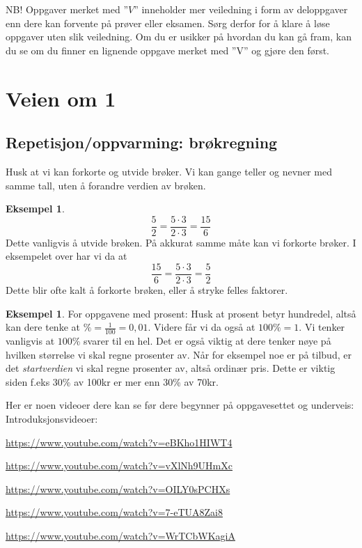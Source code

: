 \documentclass[a4, 11pt, twoside]{article}
\theoremstyle{definition}
\newtheorem{eksempel}[theorem]{Eksempel}
\begin{document}
NB! Oppgaver merket med ''$V$'' inneholder mer veiledning i form
av deloppgaver
enn dere kan forvente på prøver eller eksamen.
Sørg derfor for å klare å løse oppgaver uten slik veiledning. Om du
er usikker på hvordan du kan gå fram, kan du se om du finner en lignende
oppgave merket med ''V'' og gjøre den først.




\section*{Veien om 1}
\subsection*{Repetisjon/oppvarming: brøkregning}
Husk at vi kan forkorte og utvide brøker. Vi kan
gange teller og nevner med samme tall, uten å forandre verdien av brøken.
\begin{eksempel}
\[ \frac{5}{2} = \frac{5\cdot3}{2\cdot3} = \frac{15}{6}\]
Dette vanligvis å utvide brøken.
På akkurat samme måte kan vi forkorte brøker. I eksempelet over har vi da
at
\[\frac{15}{6} = \frac{5\cdot3}{2\cdot3} = \frac{5}{2}\]
Dette blir ofte kalt å forkorte brøken, eller å stryke felles faktorer.
\end{eksempel}
\begin{eksempel}
  For oppgavene med prosent: Husk at prosent betyr hundredel, altså kan
  dere tenke at $\% = \frac{1}{100} = 0,01$. Videre får vi da også at
  $100\% = 1$. Vi tenker vanligvis at $100\%$ svarer til en hel.
  Det er også viktig at dere tenker nøye på hvilken størrelse vi
  skal regne prosenter av. Når for eksempel noe er på tilbud, er det
  \textit{startverdien} vi skal regne prosenter av, altså ordinær pris.
  Dette er viktig siden f.eks 30\% av 100kr er mer enn 30\% av 70kr.
\end{eksempel}

Her er noen videoer dere kan se før dere begynner på oppgavesettet og
underveis:
Introduksjonsvideoer:
\begin{description}
  \item \url{https://www.youtube.com/watch?v=eBKho1HIWT4}
  \item \url{https://www.youtube.com/watch?v=vXlNh9UHmXc}
  \item[finne gammel verdi/prosentgrunnlag:] \url{https://www.youtube.com/watch?v=OILY0sPCHXs}
  \item[finne gammel verdi/prosentgrunnlag:] \url{https://www.youtube.com/watch?v=7-eTUA8Zai8}
  \item[finne gammel verdi/prosentgrunnlag:] \url{https://www.youtube.com/watch?v=WrTCbWKagiA}
\end{description}
\end{document}
